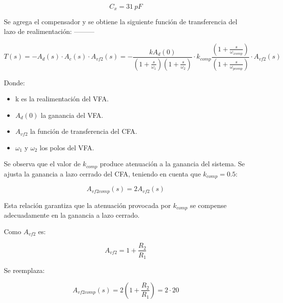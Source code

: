 \begin{equation}
    \boxed{
    C_x = 31~pF
    }
\end{equation}

\hspace{1mm} Se agrega el compensador y se obtiene la siguiente función de transferencia del lazo de realimentación: ---------

\begin{equation}
    T(s) = -A_d(s) \cdot A_c(s) \cdot A_{vf2} (s) = - \frac{kA_d(0)}{\left(1+\frac{s}{\omega_1}\right)\left(1+\frac{s}{\omega_2}\right)} \cdot k_{comp} \frac{\left(1 + \frac{s}{\omega_{zcomp}}\right)}{\left(1+\frac{s}{\omega_{pcomp}}\right)} \cdot A_{vf2}(s)
\end{equation}

\hspace{1mm} Donde:

\begin{itemize}
    \item k es la realimentación del VFA.
    \item \(A_d(0)\) la ganancia del VFA.
    \item \(A_{vf2}\) la función de transferencia del CFA.
    \item \( \omega_1 \) y \( \omega_2 \) los polos del VFA.
\end{itemize}

\hspace{1mm} Se observa que el valor de \(k_{comp}\) produce atenuación a la ganancia del sistema. Se ajusta la ganancia a lazo cerrado del CFA, teniendo en cuenta que \( k_{comp} = 0.5 \):

\begin{equation}
    A_{vf2 comp} (s) = 2A_{vf2}(s)
\end{equation}

\hspace{1mm} Esta relación garantiza que la atenuación provocada por \(k_{comp}\) se compense adecuadamente en la ganancia a lazo cerrado.

\hspace{1mm} Como \(A_{vf2}\) es:

\begin{equation}
    A_{vf2} = 1 + \frac{R_2}{R_1}
\end{equation}

\hspace{1mm} Se reemplaza:

\begin{equation}
    A_{vf2 comp} (s) = 2 \left( 1 + \frac{R_2}{R_1} \right) = 2 \cdot 20
\end{equation}

